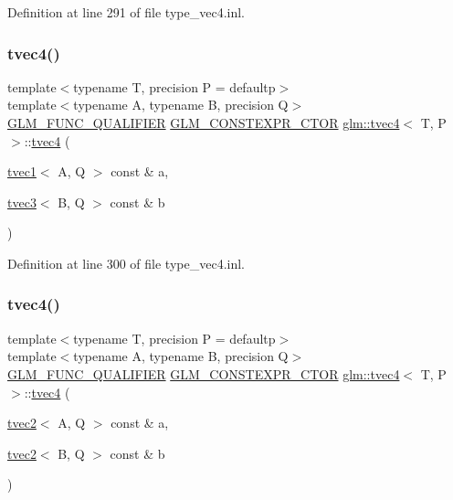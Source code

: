 Definition at line 291 of file type\+\_\+vec4.\+inl.

\mbox{\label{structglm_1_1tvec4_aebea9cbe53b55ac6ed167355f13c22ad}} 
\subsubsection{\texorpdfstring{tvec4()}{tvec4()}\hspace{0.1cm}{\footnotesize\ttfamily [33/35]}}
{\footnotesize\ttfamily template$<$typename T, precision P = defaultp$>$ \\
template$<$typename A, typename B, precision Q$>$ \\
\mbox{\hyperlink{setup_8hpp_a33fdea6f91c5f834105f7415e2a64407}{G\+L\+M\+\_\+\+F\+U\+N\+C\+\_\+\+Q\+U\+A\+L\+I\+F\+I\+ER}} \mbox{\hyperlink{setup_8hpp_ad34178a09666081abdb573c14d1f4a5a}{G\+L\+M\+\_\+\+C\+O\+N\+S\+T\+E\+X\+P\+R\+\_\+\+C\+T\+OR}} \mbox{\hyperlink{structglm_1_1tvec4}{glm\+::tvec4}}$<$ T, P $>$\+::\mbox{\hyperlink{structglm_1_1tvec4}{tvec4}} (\begin{DoxyParamCaption}\item[{\mbox{\hyperlink{structglm_1_1tvec1}{tvec1}}$<$ A, Q $>$ const \&}]{a,  }\item[{\mbox{\hyperlink{structglm_1_1tvec3}{tvec3}}$<$ B, Q $>$ const \&}]{b }\end{DoxyParamCaption})}



Definition at line 300 of file type\+\_\+vec4.\+inl.

\mbox{\label{structglm_1_1tvec4_acbcc1f7e126da183f0d84b52f36416b5}} 
\subsubsection{\texorpdfstring{tvec4()}{tvec4()}\hspace{0.1cm}{\footnotesize\ttfamily [34/35]}}
{\footnotesize\ttfamily template$<$typename T, precision P = defaultp$>$ \\
template$<$typename A, typename B, precision Q$>$ \\
\mbox{\hyperlink{setup_8hpp_a33fdea6f91c5f834105f7415e2a64407}{G\+L\+M\+\_\+\+F\+U\+N\+C\+\_\+\+Q\+U\+A\+L\+I\+F\+I\+ER}} \mbox{\hyperlink{setup_8hpp_ad34178a09666081abdb573c14d1f4a5a}{G\+L\+M\+\_\+\+C\+O\+N\+S\+T\+E\+X\+P\+R\+\_\+\+C\+T\+OR}} \mbox{\hyperlink{structglm_1_1tvec4}{glm\+::tvec4}}$<$ T, P $>$\+::\mbox{\hyperlink{structglm_1_1tvec4}{tvec4}} (\begin{DoxyParamCaption}\item[{\mbox{\hyperlink{structglm_1_1tvec2}{tvec2}}$<$ A, Q $>$ const \&}]{a,  }\item[{\mbox{\hyperlink{structglm_1_1tvec2}{tvec2}}$<$ B, Q $>$ const \&}]{b }\end{DoxyParamCaption})}



